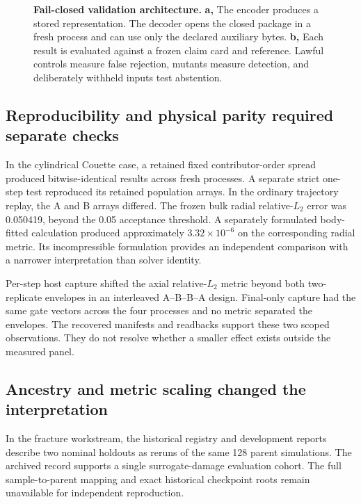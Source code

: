 \documentclass[10pt,a4paper,twocolumn]{article}
\begin{document}
\begin{figure}[t]
{%
}
\caption{\textbf{Fail-closed validation architecture.} \textbf{a,} The encoder produces a stored representation. The decoder opens the closed package in a fresh process and can use only the declared auxiliary bytes. \textbf{b,} Each result is evaluated against a frozen claim card and reference. Lawful controls measure false rejection, mutants measure detection, and deliberately withheld inputs test abstention.}
\label{fig:architecture}
\end{figure}

\subsection{Reproducibility and physical parity required separate checks}
In the cylindrical Couette case, a retained fixed contributor-order spread produced bitwise-identical results across fresh processes. A separate strict one-step test reproduced its retained population arrays. In the ordinary trajectory replay, the A and B arrays differed. The frozen bulk radial relative-$L_2$ error was 0.050419, beyond the 0.05 acceptance threshold. A separately formulated body-fitted calculation produced approximately $3.32\times10^{-6}$ on the corresponding radial metric. Its incompressible formulation provides an independent comparison with a narrower interpretation than solver identity.

Per-step host capture shifted the axial relative-$L_2$ metric beyond both two-replicate envelopes in an interleaved A--B--B--A design. Final-only capture had the same gate vectors across the four processes and no metric separated the envelopes. The recovered manifests and readbacks support these two scoped observations. They do not resolve whether a smaller effect exists outside the measured panel.

\subsection{Ancestry and metric scaling changed the interpretation}
In the fracture workstream, the historical registry and development reports describe two nominal holdouts as reruns of the same 128 parent simulations. The archived record supports a single surrogate-damage evaluation cohort. The full sample-to-parent mapping and exact historical checkpoint roots remain unavailable for independent reproduction.
\end{document}
